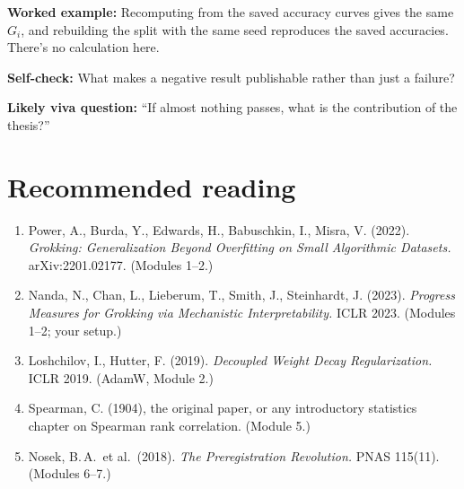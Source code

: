 \documentclass[11pt,a4paper,oneside,openany]{report}
\newcommand{\fex}{\par\textbf{Worked example:} }
\newcommand{\fself}{\par\textbf{Self-check:} }
\newcommand{\fviva}{\par\textbf{Likely viva question:} }
\begin{document}
\fex Recomputing from the saved accuracy curves gives the same $G_i$, and rebuilding the split with the same seed reproduces the saved accuracies. There's no calculation here.

\fself What makes a negative result publishable rather than just a failure?
\fviva ``If almost nothing passes, what is the contribution of the thesis?''

\chapter*{Recommended reading}
\begin{sloppypar}
\begin{enumerate}
\item[{[1]}] Power, A., Burda, Y., Edwards, H., Babuschkin, I., Misra, V. (2022). \emph{Grokking: Generalization Beyond Overfitting on Small Algorithmic Datasets.} arXiv:2201.02177. (Modules 1--2.)
\item[{[2]}] Nanda, N., Chan, L., Lieberum, T., Smith, J., Steinhardt, J. (2023). \emph{Progress Measures for Grokking via Mechanistic Interpretability.} ICLR 2023. (Modules 1--2; your setup.)
\item[{[3]}] Loshchilov, I., Hutter, F. (2019). \emph{Decoupled Weight Decay Regularization.} ICLR 2019. (AdamW, Module 2.)
\item[{[4]}] Spearman, C. (1904), the original paper, or any introductory statistics chapter on Spearman rank correlation. (Module 5.)
\item[{[5]}] Nosek, B.\,A.\ et al.\ (2018). \emph{The Preregistration Revolution.} PNAS 115(11). (Modules 6--7.)
\end{enumerate}
\end{sloppypar}
\end{document}
